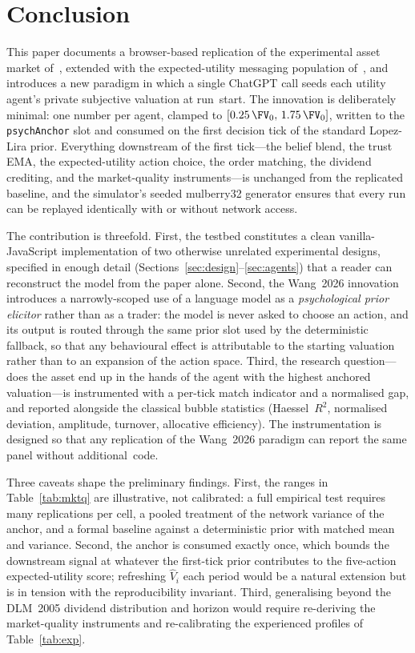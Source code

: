 \section{Conclusion}
\label{sec:conclusion}

This paper documents a browser-based replication of the
experimental asset market of~\citet{dufwenberg2005bubbles},
extended with the expected-utility messaging population
of~\citet{lopezlira2025llm}, and introduces a new paradigm in
which a single ChatGPT call seeds each utility agent's private
subjective valuation at run~start. The innovation is deliberately
minimal: one number per agent, clamped to
$[0.25\,\FV_0,\,1.75\,\FV_0]$, written to the
\texttt{psychAnchor} slot and consumed on the first decision tick
of the standard Lopez-Lira prior. Everything downstream of the
first tick---the belief blend, the trust EMA, the expected-utility
action choice, the order matching, the dividend crediting, and
the market-quality instruments---is unchanged from the replicated
baseline, and the simulator's seeded mulberry32 generator ensures
that every run can be replayed identically with or without network
access.

The contribution is threefold. First, the testbed constitutes a
clean vanilla-JavaScript implementation of two otherwise unrelated
experimental designs, specified in enough detail
(Sections~\ref{sec:design}--\ref{sec:agents}) that a reader can
reconstruct the model from the paper alone. Second, the Wang~2026
innovation introduces a narrowly-scoped use of a language model as
a \emph{psychological prior elicitor} rather than as a trader: the
model is never asked to choose an action, and its output is routed
through the same prior slot used by the deterministic fallback,
so that any behavioural effect is attributable to the starting
valuation rather than to an expansion of the action space. Third,
the research question---does the asset end up in the hands of the
agent with the highest anchored valuation---is instrumented with
a per-tick match indicator and a normalised gap, and reported
alongside the classical bubble statistics
(Haessel~$R^2$, normalised deviation, amplitude, turnover,
allocative efficiency). The instrumentation is designed so that
any replication of the Wang~2026 paradigm can report the same
panel without additional~code.

Three caveats shape the preliminary findings. First, the ranges in
Table~\ref{tab:mktq} are illustrative, not calibrated: a full
empirical test requires many replications per cell, a pooled
treatment of the network variance of the anchor, and a formal
baseline against a deterministic prior with matched mean and
variance. Second, the anchor is consumed exactly once, which bounds
the downstream signal at whatever the first-tick prior contributes
to the five-action expected-utility score; refreshing $\hat V_i$
each period would be a natural extension but is in tension with the
reproducibility invariant. Third, generalising beyond the DLM~2005
dividend distribution and horizon would require re-deriving the
market-quality instruments and re-calibrating the experienced
profiles of Table~\ref{tab:exp}.

